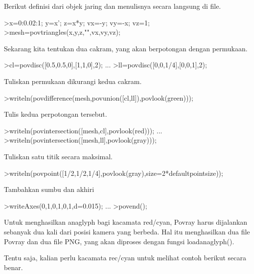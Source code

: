 \documentclass{article}
\begin{document}
\begin{eulernotebook}
\begin{eulercomment}
Berikut definisi dari objek jaring dan menulisnya secara langsung di
file.
\end{eulercomment}
\begin{eulerprompt}
>x=0:0.02:1; y=x'; z=x*y; vx=-y; vy=-x; vz=1;
>mesh=povtriangles(x,y,z,"",vx,vy,vz);
\end{eulerprompt}
\begin{eulercomment}
Sekarang kita tentukan dua cakram, yang akan berpotongan dengan
permukaan.
\end{eulercomment}
\begin{eulerprompt}
>cl=povdisc([0.5,0.5,0],[1,1,0],2); ...
>ll=povdisc([0,0,1/4],[0,0,1],2);
\end{eulerprompt}
\begin{eulercomment}
Tuliskan permukaan dikurangi kedua cakram.
\end{eulercomment}
\begin{eulerprompt}
>writeln(povdifference(mesh,povunion([cl,ll]),povlook(green)));
\end{eulerprompt}
\begin{eulercomment}
Tulis kedua perpotongan tersebut.
\end{eulercomment}
\begin{eulerprompt}
>writeln(povintersection([mesh,cl],povlook(red))); ...
>writeln(povintersection([mesh,ll],povlook(gray)));
\end{eulerprompt}
\begin{eulercomment}
Tuliskan satu titik secara maksimal.
\end{eulercomment}
\begin{eulerprompt}
>writeln(povpoint([1/2,1/2,1/4],povlook(gray),size=2*defaultpointsize));
\end{eulerprompt}
\begin{eulercomment}
Tambahkan sumbu dan akhiri
\end{eulercomment}
\begin{eulerprompt}
>writeAxes(0,1,0,1,0,1,d=0.015); ...
>povend();
\end{eulerprompt}
\begin{eulercomment}
Untuk menghasilkan anaglyph bagi kacamata red/cyan, Povray harus
dijalankan sebanyak dua kali dari posisi kamera yang berbeda. Hal itu
menghasilkan dua file Povray dan dua file PNG, yang akan diproses
dengan fungsi loadanaglyph().

Tentu saja, kalian perlu kacamata rec/cyan untuk melihat contoh
berikut secara benar.


\end{eulercomment}
\end{eulernotebook}
\end{document}
